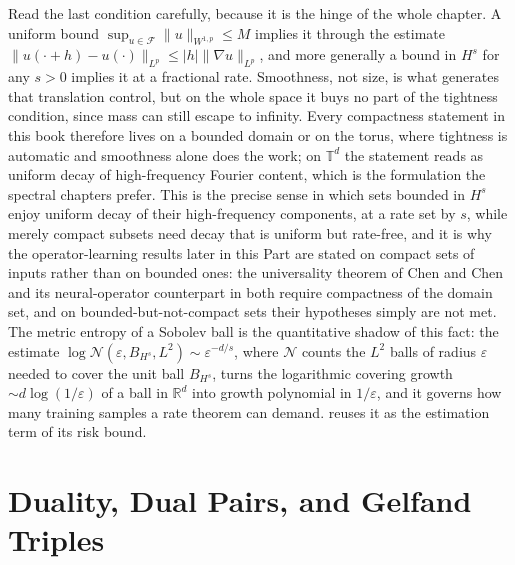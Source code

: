 Read the last condition carefully, because it is the hinge of the whole chapter. A uniform bound $\sup_{u \in \mathcal{F}} \|u\|_{W^{1,p}} \le M$ implies it through the estimate
$\|u(\cdot + h) - u(\cdot)\|_{L^p} \le |h| \|\nabla u\|_{L^p}$,
and more generally a bound in $H^s$ for any $s > 0$ implies it at a fractional rate. Smoothness, not size, is what generates that translation control, but on the whole space it buys no part of the tightness condition, since mass can still escape to infinity. Every compactness statement in this book therefore lives on a bounded domain or on the torus, where tightness is automatic and smoothness alone does the work; on $\mathbb{T}^d$ the statement reads as uniform decay of high-frequency Fourier content, which is the formulation the spectral chapters prefer. This is the precise sense in which sets bounded in $H^{s}$ enjoy uniform decay of their high-frequency components, at a rate set by $s$, while merely compact subsets need decay that is uniform but rate-free, and it is why the operator-learning results later in this Part are stated on compact sets of inputs rather than on bounded ones: the universality theorem of Chen and Chen~\cite{chen1995universal} and its neural-operator counterpart in  both require compactness of the domain set, and on bounded-but-not-compact sets their hypotheses simply are not met. The metric entropy of a Sobolev ball is the quantitative shadow of this fact: the estimate $\log \mathcal{N}(\varepsilon, B_{H^s}, L^2) \sim \varepsilon^{-d/s}$, where $\mathcal{N}$ counts the $L^2$ balls of radius $\varepsilon$ needed to cover the unit ball $B_{H^s}$, turns the logarithmic covering growth $\sim d\log(1/\varepsilon)$ of a ball in $\mathbb{R}^d$ into growth polynomial in $1/\varepsilon$, and it governs how many training samples a rate theorem can demand.  reuses it as the estimation term of its risk bound.

\section{Duality, Dual Pairs, and Gelfand Triples}

